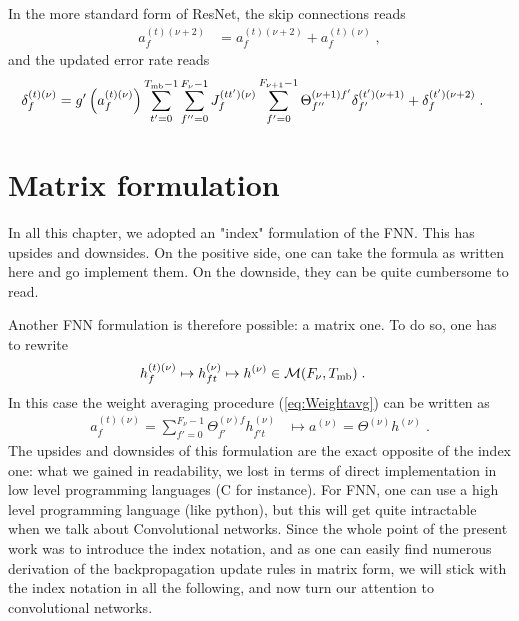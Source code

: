 \begin{subappendices}
In the more standard form of ResNet, the skip connections reads
\begin{align}
 a_{f}^{(t)(\nu+2)}&= a_{f}^{(t)(\nu+2)}+ a_{f}^{(t)(\nu)}\;,
\end{align}
and the updated error rate reads
\begin{align}
\delta^{(t)(\nu)}_f&=g'\left(a_{f}^{(t)(\nu)}\right)
%
\sum_{t'=0}^{T_{{\rm mb}}-1}\sum^{F_{\nu}-1}_{f''=0}J^{(tt')(\nu)}_{f}
%
\sum_{f'=0}^{F_{\nu+1}-1}\Theta^{(\nu+1)f'}_{f''}\delta^{(t')(\nu+1)}_{f'}+\delta^{(t')(\nu+2)}_{f}\;.
\end{align}


\section{Matrix formulation}

In all this chapter, we adopted an "index" formulation of the FNN. This has upsides and downsides. On the positive side, one can take the formula as written here and go implement them. On the downside, they can be quite cumbersome to read. 

\vspace{0.2cm}

Another FNN formulation is therefore possible: a matrix one. To do so, one has to rewrite
\begin{align}
h_f^{(t)(\nu)}\mapsto h^{(\nu)}_{ft}&\mapsto h^{(\nu)}\in \mathcal{M}(F_\nu,T_{\rm mb})\;.
\end{align}
In this case the weight averaging procedure (\ref{eq:Weightavg}) can be written as
\begin{align}
a_f^{(t)(\nu)}=\sum_{f'=0}^{F_\nu-1}\Theta^{(\nu)f}_{f'}h^{(\nu)}_{f't}&\mapsto a^{(\nu)}=\Theta^{(\nu)}h^{(\nu)}\;.
\end{align}
The upsides and downsides of this formulation are the exact opposite of the index one: what we gained in readability, we lost in terms of direct implementation in low level programming languages (C for instance). For FNN, one can use a high level programming language (like python), but this will get quite intractable when we talk about Convolutional networks. Since the whole point of the present work was to introduce the index notation, and as one can easily find numerous derivation of the backpropagation update rules in matrix form, we will stick with the index notation in all the following, and now turn our attention to convolutional networks.
\end{subappendices}
